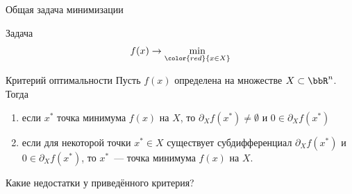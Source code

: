 \documentclass[12pt]{beamer}
\begin{document}
\begin{frame}{Общая задача минимизации}

\begin{block}{Задача}
\[
f(x) \rightarrow \min\limits_{{\color{red}{x \in X}}}
\]
\end{block}

\begin{block}{Критерий оптимальности}
Пусть $f(x)$ определена на множестве $X \subset \bbR^n$.
Тогда 
\begin{enumerate}
\item если $x^*$ точка минимума $f(x)$ на $X$, то $\partial_X f(x^*) \neq \emptyset$ и $0 \in \partial_X f(x^*)$
\item если для некоторой точки $x^* \in X$ существует субдифференциал $\partial_X f(x^*)$ и $0 \in \partial_X f(x^*)$, то $x^*$~--- точка минимума $f(x)$ на $X$.
\end{enumerate}
\end{block}
Какие недостатки у приведённого критерия?

\end{frame}

\end{document}
